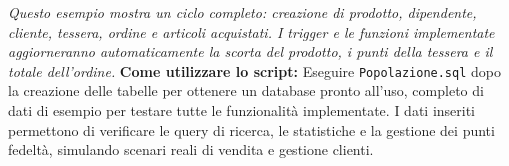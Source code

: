 \documentclass[a4paper,12pt]{article}
\begin{document}
\vspace{0.5em}
\textit{Questo esempio mostra un ciclo completo: creazione di prodotto, dipendente, cliente, tessera, ordine e articoli acquistati. I trigger e le funzioni implementate aggiorneranno automaticamente la scorta del prodotto, i punti della tessera e il totale dell'ordine.}
\vspace{0.5em}
\textbf{Come utilizzare lo script:}
\newline
Eseguire \texttt{Popolazione.sql} dopo la creazione delle tabelle per ottenere un database pronto all'uso, completo di dati di esempio per testare tutte le funzionalità implementate. I dati inseriti permettono di verificare le query di ricerca, le statistiche e la gestione dei punti fedeltà, simulando scenari reali di vendita e gestione clienti.
\end{document}

